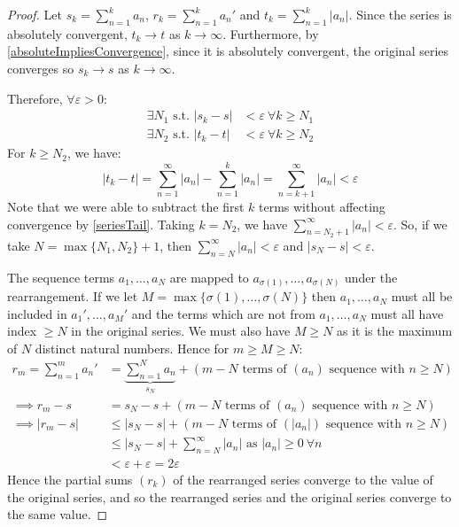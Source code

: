 \documentclass[../main.tex]{subfiles}
\begin{document}
\begin{proof}
  Let $s_k = \sum_{n = 1}^{k} a_n$, $r_k = \sum_{n = 1}^{k} a_n'$ and $t_k = \sum_{n = 1}^{k} |a_n|$.
  Since the series is absolutely convergent, $t_k \to t$ as $k \to \infty$.
  Furthermore, by \cref{absoluteImpliesConvergence}, since it is absolutely convergent, the original series converges so $s_k \to s$ as $k \to \infty$.

  Therefore, $\forall \varepsilon > 0$:
  \begin{align*}
    \exists N_1 \text{ s.t. } |s_k - s| &< \varepsilon\ \forall k \geq N_1 \\
    \exists N_2 \text{ s.t. } |t_k - t| &< \varepsilon\ \forall k \geq N_2
  \end{align*}
  For $k \geq N_2$, we have:
  \[
    |t_k - t| = \sum_{n = 1}^{\infty} |a_n| - \sum_{n = 1}^{k} |a_n| = \sum_{n = k + 1}^{\infty} |a_n| < \varepsilon
  \]
  Note that we were able to subtract the first $k$ terms without affecting convergence by \cref{seriesTail}.
  Taking $k = N_2$, we have $\sum_{n = N_2 + 1}^{\infty} |a_n| < \varepsilon$.
  So, if we take $N = \max\{N_1, N_2\} + 1$, then $\sum_{n = N}^{\infty} |a_n| < \varepsilon$ and $|s_N - s| < \varepsilon$.

  The sequence terms $a_1, \ldots, a_N$ are mapped to $a_{\sigma(1)}, \ldots, a_{\sigma(N)}$ under the rearrangement.
  If we let $M = \max\{\sigma(1), \ldots, \sigma(N)\}$ then $a_1, \ldots, a_N$ must all be included in $a_1', \ldots, a_{M}'$ and the terms which are not from $a_1, \ldots, a_N$ must all have index $\geq N$ in the original series.
  We must also have $M \geq N$ as it is the maximum of $N$ distinct natural numbers.
  Hence for $m \geq M \geq N$:
  \begin{align*}
    r_m = \sum_{n = 1}^{m} a_n' &= \underbrace{\sum_{n = 1}^{N} a_n}_{s_N} + (m - N \text{ terms of $(a_n)$ sequence with $n \geq N$}) \\
    \implies r_m - s &= s_N - s + (m - N \text{ terms of $(a_n)$ sequence with $n \geq N$}) \\
    \implies |r_m - s| &\leq |s_N - s| + (m - N \text{ terms of $(|a_n|)$ sequence with $n \geq N$}) \\
                       &\leq |s_N - s| + \sum_{n = N}^{\infty} |a_n| \text{ as $|a_n| \geq 0\ \forall n$}\\
                       &< \varepsilon + \varepsilon = 2\varepsilon
  \end{align*}
  Hence the partial sums $(r_k)$ of the rearranged series converge to the value of the original series, and so the rearranged series and the original series converge to the same value.
\end{proof}
\end{document}
